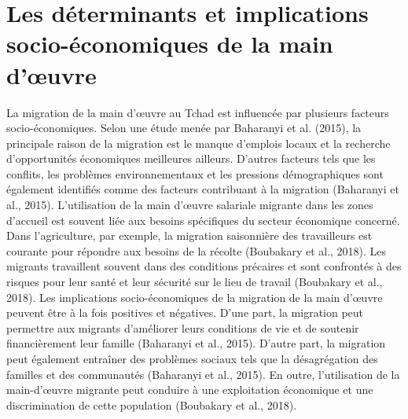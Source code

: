 \documentclass[12pt,oneside]{report}
\begin{document}
\section{Les déterminants et implications socio-économiques de la main d’œuvre}
La migration de la main d’œuvre au Tchad est influencée par plusieurs facteurs socio-économiques. Selon une étude menée par Baharanyi et al. (2015), la principale raison de la migration est le manque d'emplois locaux et la recherche d'opportunités économiques meilleures ailleurs. D'autres facteurs tels que les conflits, les problèmes environnementaux et les pressions démographiques sont également identifiés comme des facteurs contribuant à la migration (Baharanyi et al., 2015). L'utilisation de la main d'œuvre salariale migrante dans les zones d'accueil est souvent liée aux besoins spécifiques du secteur économique concerné. Dans l'agriculture, par exemple, la migration saisonnière des travailleurs est courante pour répondre aux besoins de la récolte (Boubakary et al., 2018). Les migrants travaillent souvent dans des conditions précaires et sont confrontés à des risques pour leur santé et leur sécurité sur le lieu de travail (Boubakary et al., 2018). Les implications socio-économiques de la migration de la main d'œuvre peuvent être à la fois positives et négatives. D'une part, la migration peut permettre aux migrants d'améliorer leurs conditions de vie et de soutenir financièrement leur famille (Baharanyi et al., 2015). D'autre part, la migration peut également entraîner des problèmes sociaux tels que la désagrégation des familles et des communautés (Baharanyi et al., 2015). En outre, l'utilisation de la main-d'œuvre migrante peut conduire à une exploitation économique et une discrimination de cette population (Boubakary et al., 2018).
\end{document}
